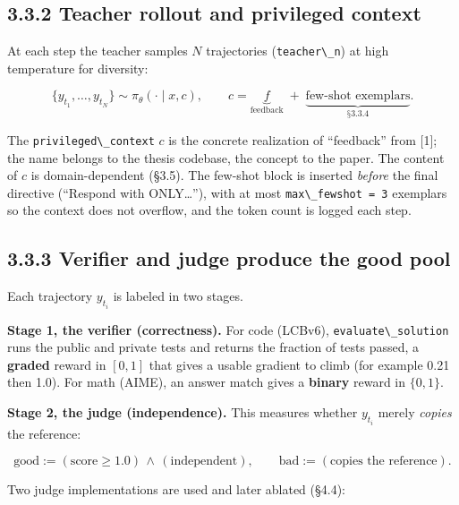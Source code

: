\subsection{3.3.2 Teacher rollout and privileged context}\label{teacher-rollout-and-privileged-context}

At each step the teacher samples \(N\) trajectories (\passthrough{\lstinline!teacher\_n!}) at high temperature for diversity:

\[
\{y_{t_1}, \dots, y_{t_N}\} \sim \pi_\theta(\cdot \mid x, c), \qquad c = \underbrace{f}_{\text{feedback}} \;+\; \underbrace{\text{few-shot exemplars}}_{\text{§3.3.4}}.
\]

The \passthrough{\lstinline!privileged\_context!} \(c\) is the concrete realization of ``feedback'' from {[}1{]}; the name belongs to the thesis codebase, the concept to the paper. The content of \(c\) is domain-dependent (§3.5). The few-shot block is inserted \emph{before} the final directive (``Respond with ONLY\ldots{}''), with at most \passthrough{\lstinline!max\_fewshot = 3!} exemplars so the context does not overflow, and the token count is logged each step.

\subsection{3.3.3 Verifier and judge produce the good pool}\label{verifier-and-judge-produce-the-good-pool}

Each trajectory \(y_{t_i}\) is labeled in two stages.

\textbf{Stage 1, the verifier (correctness).} For code (LCBv6), \passthrough{\lstinline!evaluate\_solution!} runs the public and private tests and returns the fraction of tests passed, a \textbf{graded} reward in \([0,1]\) that gives a usable gradient to climb (for example 0.21 then 1.0). For math (AIME), an answer match gives a \textbf{binary} reward in \(\{0,1\}\).

\textbf{Stage 2, the judge (independence).} This measures whether \(y_{t_i}\) merely \emph{copies} the reference:

\[
\text{good} := (\text{score} \ge 1.0) \,\wedge\, (\text{independent}), \qquad \text{bad} := (\text{copies the reference}).
\]

Two judge implementations are used and later ablated (§4.4):

